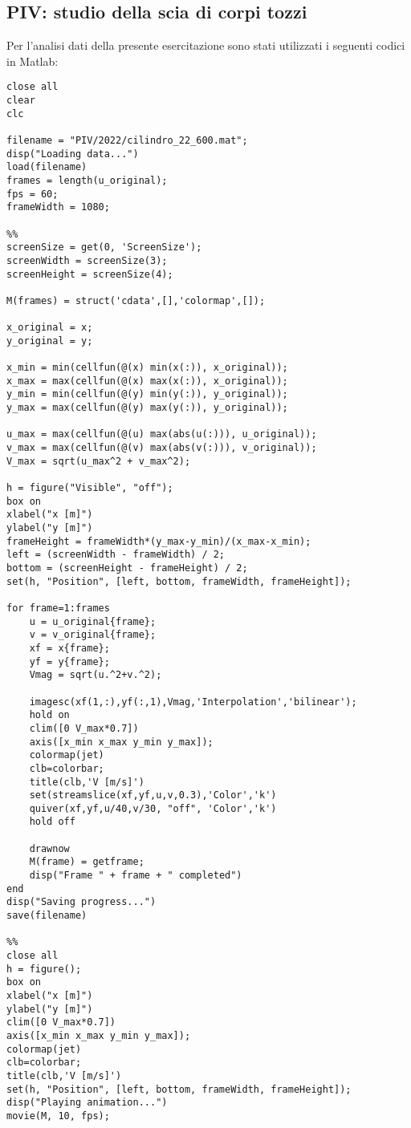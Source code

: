\subsection{PIV: studio della scia di corpi tozzi}\label{b11}
Per l'analisi dati della presente esercitazione sono stati utilizzati i seguenti codici in Matlab:
\begin{lstlisting}[style=Matlab-editor, basicstyle=\ttfamily\footnotesize]
close all
clear
clc

filename = "PIV/2022/cilindro_22_600.mat";
disp("Loading data...")
load(filename)
frames = length(u_original);
fps = 60;
frameWidth = 1080;

%%
screenSize = get(0, 'ScreenSize');
screenWidth = screenSize(3);
screenHeight = screenSize(4);

M(frames) = struct('cdata',[],'colormap',[]);

x_original = x;
y_original = y;

x_min = min(cellfun(@(x) min(x(:)), x_original));
x_max = max(cellfun(@(x) max(x(:)), x_original));
y_min = min(cellfun(@(y) min(y(:)), y_original));
y_max = max(cellfun(@(y) max(y(:)), y_original));

u_max = max(cellfun(@(u) max(abs(u(:))), u_original));
v_max = max(cellfun(@(v) max(abs(v(:))), v_original));
V_max = sqrt(u_max^2 + v_max^2);

h = figure("Visible", "off");
box on
xlabel("x [m]")
ylabel("y [m]")
frameHeight = frameWidth*(y_max-y_min)/(x_max-x_min);
left = (screenWidth - frameWidth) / 2;
bottom = (screenHeight - frameHeight) / 2;
set(h, "Position", [left, bottom, frameWidth, frameHeight]);

for frame=1:frames
    u = u_original{frame};
    v = v_original{frame};
    xf = x{frame};
    yf = y{frame};
    Vmag = sqrt(u.^2+v.^2);
    
    imagesc(xf(1,:),yf(:,1),Vmag,'Interpolation','bilinear');
    hold on
    clim([0 V_max*0.7])
    axis([x_min x_max y_min y_max]);
    colormap(jet)
    clb=colorbar;
    title(clb,'V [m/s]')
    set(streamslice(xf,yf,u,v,0.3),'Color','k')
    quiver(xf,yf,u/40,v/30, "off", 'Color','k')
    hold off

    drawnow
    M(frame) = getframe;
    disp("Frame " + frame + " completed")
end
disp("Saving progress...")
save(filename)

%%
close all
h = figure();
box on
xlabel("x [m]")
ylabel("y [m]")
clim([0 V_max*0.7])
axis([x_min x_max y_min y_max]);
colormap(jet)
clb=colorbar;
title(clb,'V [m/s]')
set(h, "Position", [left, bottom, frameWidth, frameHeight]);
disp("Playing animation...")
movie(M, 10, fps);
\end{lstlisting}

